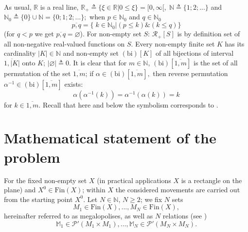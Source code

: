 \documentclass[numbers,sort&compress]{IntechOpen-Book}%
\begin{document}
As usual,
$\mathbb{R}$ is a real line,
$\mathbb{R}_+ {\triangleq} \{\xi \in \mathbb{R} \vert 0 \le \xi\} = [0,\infty[,\;\mathbb{N} {\triangleq} \{1;2;...\}$
and $\mathbb{N}_0 {\triangleq} \{0\} \cup \mathbb{N} = \{0;1;2;...\};$
when $p \in \mathbb{N}_0$
and $q \in \mathbb{N}_0$
$$
\overline{p,q} = \{\;k \in \mathbb{N}_0 \vert (p \le k) \& (k \le q)\}
$$
(for $q < p$ we get $\overline{p,q} = \varnothing$).
For non-empty set
$S$:
$\mathcal{R}_+[S]$
is
by definition
set of all non-negative real-valued functions on
$S$.
Every non-empty finite set $K$
has its cardinality
$|K| \in \mathbb{N}$
and non-empty set $(\mathrm{bi})[K]$
of all bijections
\cite[87]{17}
of interval
$\overline{1,|K|}$
onto $K$;
$|\varnothing| {\triangleq} 0$.
It is clear that for
$m \in \mathbb{N}$,
$(\mathrm{bi})[\overline{1,m}]$
is the set of all permutation
\cite[87]{17}
of the set
$\overline{1,m}$;
if
$\alpha \in (\mathrm{bi})[\overline{1,m}],$
then reverse permutation
$\alpha^{-1} \in (\mathrm{bi})[\overline{1,m}]$
exists:
$$
    \alpha(\alpha^{-1}(k)) = \alpha^{-1}(\alpha(k)) = k
$$
for $k \in \overline{1,m}.$
Recall that here and below the symbolism corresponds to
\cite[$\S$3.1]{4}.

\section{Mathematical statement of the problem}
\label{sec:2}

For the fixed non-empty set
$X$
(in practical applications
\cite{4}
$X$
is a rectangle on the plane)
and $X^0 \in \mathrm{Fin}(X)$;
within $ X $ the considered movements are carried out
from the starting point
$ X ^ 0 $.
Let $N \in \mathbb{N}$,
$N\ge 2$;
we fix $N$ sets
\begin{equation}\label{2.1}
M_1 \in \mathrm{Fin}(X),...,M_N \in \mathrm{Fin}(X),
\end{equation}
hereinafter referred to as megalopolises,
as well as
$N$
relations
(see \cite[chapter II,$\S$4]{15})
\begin{equation}\label{2.2}
\mathbb{M}_1 \in \mathcal{P}'(M_1 \times M_1), \dots ,
    \mathbb{M}_N \in \mathcal{P}'(M_N \times M_N).
\end{equation}
\end{document}
